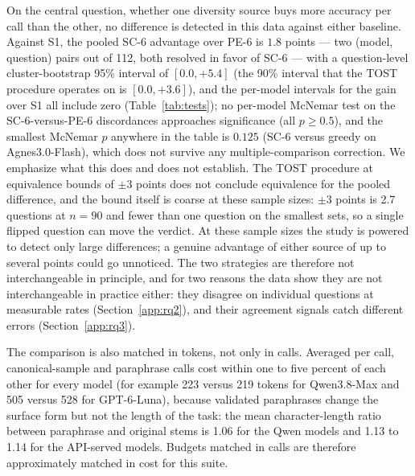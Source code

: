 On the central question, whether one diversity source buys more accuracy per call than the other, no difference is detected in this data against either baseline. Against S1, the pooled SC-6 advantage over PE-6 is $1.8$ points --- two (model, question) pairs out of 112, both resolved in favor of SC-6 --- with a question-level cluster-bootstrap 95\% interval of $[0.0, +5.4]$ (the 90\% interval that the TOST procedure operates on is $[0.0, +3.6]$), and the per-model intervals for the gain over S1 all include zero (Table~\ref{tab:tests}); no per-model McNemar test on the SC-6-versus-PE-6 discordances approaches significance (all $p \ge 0.5$), and the smallest McNemar $p$ anywhere in the table is $0.125$ (SC-6 versus greedy on Agnes3.0-Flash), which does not survive any multiple-comparison correction. We emphasize what this does and does not establish. The TOST procedure at equivalence bounds of $\pm 3$ points does not conclude equivalence for the pooled difference, and the bound itself is coarse at these sample sizes: $\pm 3$ points is 2.7 questions at $n = 90$ and fewer than one question on the smallest sets, so a single flipped question can move the verdict. At these sample sizes the study is powered to detect only large differences; a genuine advantage of either source of up to several points could go unnoticed. The two strategies are therefore not interchangeable in principle, and for two reasons the data show they are not interchangeable in practice either: they disagree on individual questions at measurable rates (Section~\ref{app:rq2}), and their agreement signals catch different errors (Section~\ref{app:rq3}).

\begin{table}[htbp]
\centering
\footnotesize
\caption{Paired comparisons between conditions on the development suite: discordant counts ($b$: first condition right, second wrong; $c$: the reverse), exact McNemar $p$, accuracy difference with 95\% question-resampled bootstrap CI, and the TOST verdict at $\pm 3$ point equivalence bounds. ``no'' means equivalence is not established at this sample size, not that a difference was found.}
\label{tab:tests}

\end{table}

The comparison is also matched in tokens, not only in calls. Averaged per call, canonical-sample and paraphrase calls cost within one to five percent of each other for every model (for example 223 versus 219 tokens for Qwen3.8-Max and 505 versus 528 for GPT-6-Luna), because validated paraphrases change the surface form but not the length of the task: the mean character-length ratio between paraphrase and original stems is 1.06 for the Qwen models and 1.13 to 1.14 for the API-served models. Budgets matched in calls are therefore approximately matched in cost for this suite.

